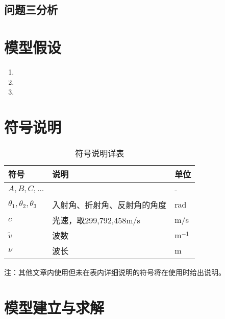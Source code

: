 \documentclass[withoutpreface,bwprint]{cumcmthesis} %
\begin{document}
\subsection{问题三分析}

\section{模型假设}

\begin{enumerate}
    \item 
    \item 
    \item 
\end{enumerate}

\section{符号说明}

\begin{table}[H]
    \centering  %
    \caption{符号说明详表}  %
    \label{tab:符号说明}  %
    \begin{threeparttable}
        \begin{tabularx}{\textwidth}{p{} p{} l}
            \toprule[1.5pt]
            \textbf{符号} & \textbf{说明} & \textbf{单位} \\ 
            \midrule[1pt]
            $A, B, C, ...$ &  & - \\
            $\theta_1, \theta_2, \theta_3$ & 入射角、折射角、反射角的角度 & rad \\
            $c$ & 光速，取299,792,458m/s & m/s \\
            $\tilde{v} $ & 波数 & m$^{-1}$\\
            $\nu$ & 波长 & m\\
            \bottomrule[1.5pt]
        
        \end{tabularx}
        \begin{tablenotes}
            \footnotesize
            \item 注：其他文章内使用但未在表内详细说明的符号将在使用时给出说明。
        \end{tablenotes}
    \end{threeparttable}
\end{table}




\section{模型建立与求解}
\end{document}
